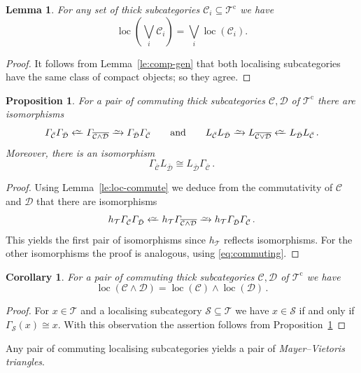 \documentclass{amsart}[a4]
\newtheorem{corollary}[theorem]{Corollary}
\newtheorem{lemma}[theorem]{Lemma}
\newtheorem{proposition}[theorem]{Proposition}
\theoremstyle{definition}
\theoremstyle{remark}
\numberwithin{equation}{section}
\newcommand{\loc}{\operatorname{loc}}
\newcommand{\iso}{\xrightarrow{\raisebox{-.6ex}[0ex][0ex]{$\scriptstyle{\sim}$}}}
\newcommand{\leftiso}{\xleftarrow{\raisebox{-.6ex}[0ex][0ex]{$\scriptstyle{\sim}$}}}
\newcommand{\cat}{\mathcal}
\let\Gamma\varGamma
\begin{document}
\begin{lemma}
For any set of thick subcategories
$\cat C_i\subseteq\cat T^{\mathrm c}$ we have
\[\loc\left(\bigvee_i \cat C_i\right)=\bigvee_i\loc(\cat C_i).\]
\end{lemma}
\begin{proof}
  It follows from Lemma~\ref{le:comp-gen} that both localising
  subcategories have the same class of compact objects; so they agree.
\end{proof}

\begin{proposition}\label{pr:loc-commuting}
  For  a pair of commuting thick subcategories
  $\cat C,\cat D$ of $\cat T^{\mathrm c}$  there are isomorphisms
\[\Gamma_{\bar{\cat C}}\Gamma_{\bar{\cat D}}\leftiso\Gamma_{\overline{\cat C\wedge\cat
      D}}\iso \Gamma_{\bar{\cat D}}\Gamma_{\bar{\cat
      C}}\qquad\text{and}\qquad L_{\bar{\cat C}}L_{\bar{\cat D}}\iso L_{\overline{\cat C\vee\cat
      D}}\leftiso L_{\bar{\cat D}}L_{\bar{\cat C}}\,.\]
Moreover, there is an isomorphism
\[\Gamma_{\bar{\cat C}} L_{\bar{\cat D}}\cong L_{\bar{\cat D}}\Gamma_{\bar{\cat C}}\,.\]
\end{proposition}
\begin{proof}
Using Lemma~\ref{le:loc-commute} we deduce from the commutativity of
$\cat C$ and $\cat D$ that there  are isomorphisms
\[h_\cat T\Gamma_{\bar{\cat C}}\Gamma_{\bar{\cat D}}\leftiso h_\cat
  T\Gamma_{\overline{\cat C\wedge\cat D}}\iso h_\cat
  T\Gamma_{\bar{\cat D}}\Gamma_{\bar{\cat C}}\,.\] This yields the
first pair of isomorphisms since $h_\cat T$ reflects isomorphisms. For
the other isomorphisms the proof is analogous, using \eqref{eq:commuting}.
\end{proof}

\begin{corollary}
 For  a pair of commuting thick subcategories
  $\cat C,\cat D$ of $\cat T^{\mathrm c}$ we have
  \[\loc(\cat C\wedge\cat D)=\loc(\cat C)\wedge\loc(\cat D)\,.\]
\end{corollary}  
\begin{proof}
  For $x\in\cat T$ and a localising subcategory
  $\cat S\subseteq\cat T$ we have $x\in\cat S$ if and only if
  $\Gamma_\cat S(x)\cong x$. With this observation the  assertion
  follows from Proposition~\ref{pr:loc-commuting}
\end{proof}

Any pair of commuting localising subcategories yields a pair of
\emph{Mayer--Vietoris triangles}.
\end{document}
